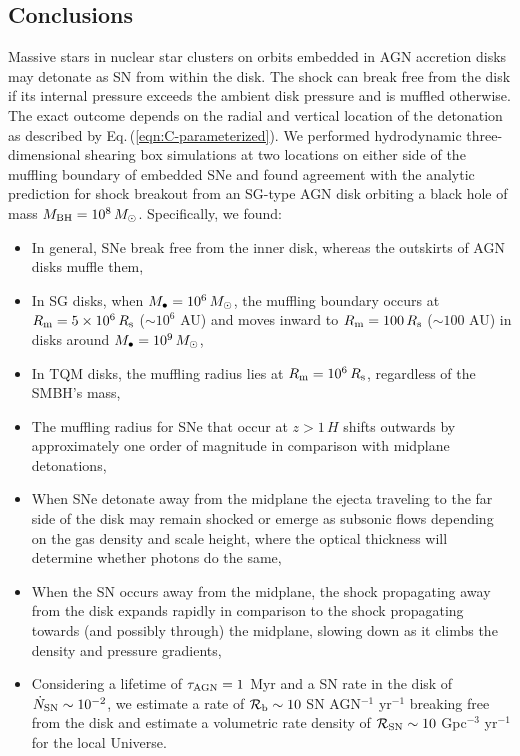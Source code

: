
\subsection{Conclusions}
\label{sec:conclusions-snhydro}
Massive stars in nuclear star clusters on orbits embedded in AGN accretion disks may detonate as SN from within the disk.
The shock can break free from the disk if its internal pressure exceeds the ambient disk pressure and is muffled otherwise.
The exact outcome depends on the radial and vertical location of the detonation as described by Eq.\,(\ref{eqn:C-parameterized}).
We performed hydrodynamic three-dimensional shearing box simulations at two locations on either side of the muffling boundary of embedded SNe and found agreement with the analytic prediction for shock breakout from an SG-type AGN disk orbiting a black hole of mass $M_{\rm BH}=10^8\,M_{\odot}$.
Specifically, we found:

\begin{itemize}
    \item In general, SNe break free from the inner disk, whereas the outskirts of AGN disks muffle them,
    \item In SG disks, when $M_\bullet=10^6\,M_{\odot}$, the muffling boundary occurs at $R_{\rm m}=5\times10^6\,R_{\rm s}$ ($\sim10^6$ AU) and moves inward to $R_{\rm m}=100\,R_{\rm s}$ ($\sim100$ AU) in disks around $M_\bullet=10^9\,M_{\odot}$,
    \item In TQM disks, the muffling radius lies at $R_{\rm m}=10^6\,R_{\rm s}$, regardless of the SMBH's mass,
    \item The muffling radius for SNe that occur at $z>1\,H$ shifts outwards by approximately one order of magnitude in comparison with midplane detonations,
    \item When SNe detonate away from the midplane the ejecta traveling to the far side of the disk may remain shocked or emerge as subsonic flows depending on the gas density and scale height, where the optical thickness will determine whether photons do the same,
    \item When the SN occurs away from the midplane, the shock propagating away from the disk expands rapidly in comparison to the shock propagating towards (and possibly through) the midplane, slowing down as it climbs the density and pressure gradients,
    \item Considering a lifetime of $\tau_{\rm AGN}=1$ Myr and a SN rate in the disk of $\dot{N}_{\rm SN} \sim 10^{-2}$, we estimate a rate of $\mathcal{R}_{\rm b} \sim 10$ SN AGN$^{-1}$ yr$^{-1}$ breaking free from the disk and estimate a volumetric rate density of $\mathcal{R}_{\rm SN} \sim 10$ Gpc$^{-3}$ yr$^{-1}$ for the local Universe.
\end{itemize}


